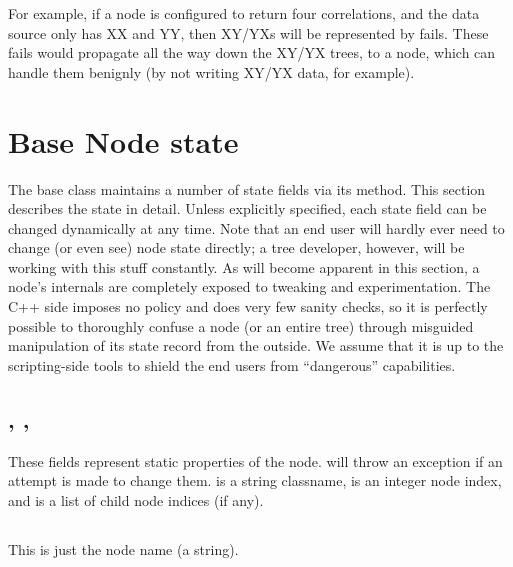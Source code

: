 \documentclass[10pt]{article}
\begin{document}
  For example, if a  node is configured to return four correlations,
  and the data source only has XX and YY, then XY/YXs will be represented by
  fails. These fails would propagate all the way down the XY/YX trees, to a
   node, which can handle them benignly (by not writing XY/YX data,
  for example).

\section{Base Node state}

  The base  class maintains a number of state fields via its
   method. This section describes the state in detail.
  Unless explicitly specified, each state field can be changed dynamically at
  any time. Note that an end user will hardly ever need to change (or even see)
  node state directly; a tree developer, however, will be working with this
  stuff constantly. As will become apparent in this section, a node's internals
  are completely exposed to tweaking and experimentation. The C++ side imposes
  no policy and does very few sanity checks, so it is perfectly possible  to
  thoroughly confuse a node (or an entire tree) through misguided  manipulation
  of its state record from the outside. We assume that it is up to the
  scripting-side tools to shield the end users from ``dangerous'' capabilities.

\subsection{, , } 
  
  These fields represent static properties of the node. 
  will throw an exception if an attempt is made to change them.  is a
  string classname,  is an integer node index, and 
  is a list of child node indices (if any).

\subsection{}
  
  This is just the node name (a string). 
 
\subsection{}
  
\end{document}
